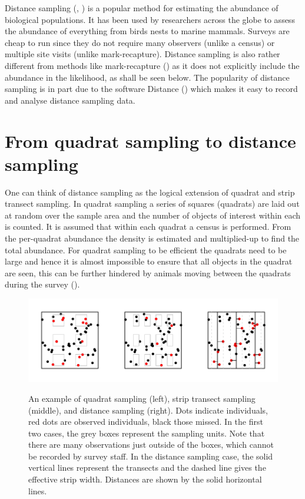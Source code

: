 \label{chap-intro-ds}

\label{intro-DS}

Distance sampling (\cite{IDS}, \cite{ADS}) is a popular method for estimating the abundance of biological populations. It has been used by researchers across the globe to assess the abundance of everything from birds nests to marine mammals. Surveys are cheap to run since they do not require many observers (unlike a census) or multiple site visits (unlike mark-recapture). Distance sampling is also rather different from methods like mark-recapture (\cite{ruthbook}) as it does not explicitly include the abundance in the likelihood, as shall be seen below. The popularity of distance sampling is in part due to the software Distance (\cite{distance-software}) which makes it easy to record and analyse distance sampling data. 

\section{From quadrat sampling to distance sampling}
\label{quad2ds}

One can think of distance sampling as the logical extension of quadrat and strip transect sampling. In quadrat sampling a series of squares (quadrats) are laid out at random over the sample area and the number of objects of interest within each is counted. It is assumed that within each quadrat a census is performed. From the per-quadrat abundance the density is estimated and multiplied-up to find the total abundance. For quadrat sampling to be efficient the quadrats need to be large and hence it is almost impossible to ensure that all objects in the quadrat are seen, this can be further hindered by animals moving between the quadrats during the survey (\cite[p. 2]{IDS}).

\begin{figure}
\centering
\includegraphics{intro/figs/quadrat-to-ds.pdf}\\
\caption{An example of quadrat sampling (left), strip transect sampling (middle), and distance sampling (right). Dots indicate individuals, red dots are observed individuals, black those missed. In the first two cases, the grey boxes represent the sampling units. Note that there are many observations just outside of the boxes, which cannot be recorded by survey staff. In the distance sampling case, the solid vertical lines represent the transects and the dashed line gives the effective strip width. Distances are shown by the solid horizontal lines.}
\label{quad-to-ds}
\end{figure}

